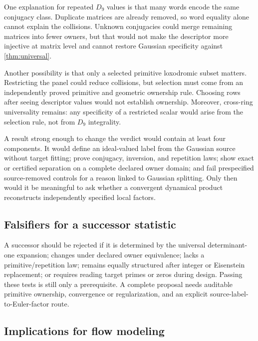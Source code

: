\documentclass[11pt,a4paper]{article}
\theoremstyle{definition}
\theoremstyle{remark}
\begin{document}
One explanation for repeated \(D_9\) values is that many words encode the same conjugacy class. Duplicate matrices are already removed, so word equality alone cannot explain the collisions. Unknown conjugacies could merge remaining matrices into fewer owners, but that would not make the descriptor more injective at matrix level and cannot restore Gaussian specificity against \cref{thm:universal}.

Another possibility is that only a selected primitive loxodromic subset matters. Restricting the panel could reduce collisions, but selection must come from an independently proved primitive and geometric ownership rule. Choosing rows after seeing descriptor values would not establish ownership. Moreover, cross-ring universality remains: any specificity of a restricted scalar would arise from the selection rule, not from \(D_9\) integrality.

A result strong enough to change the verdict would contain at least four components. It would define an ideal-valued label from the Gaussian source without target fitting; prove conjugacy, inversion, and repetition laws; show exact or certified separation on a complete declared owner domain; and fail prespecified source-removed controls for a reason linked to Gaussian splitting. Only then would it be meaningful to ask whether a convergent dynamical product reconstructs independently specified local factors.

\subsection{Falsifiers for a successor statistic}

A successor should be rejected if it is determined by the universal determinant-one expansion; changes under declared owner equivalence; lacks a primitive/repetition law; remains equally structured after integer or Eisenstein replacement; or requires reading target primes or zeros during design. Passing these tests is still only a prerequisite. A complete proposal needs auditable primitive ownership, convergence or regularization, and an explicit source-label-to-Euler-factor route.

\subsection{Implications for flow modeling}
\end{document}
